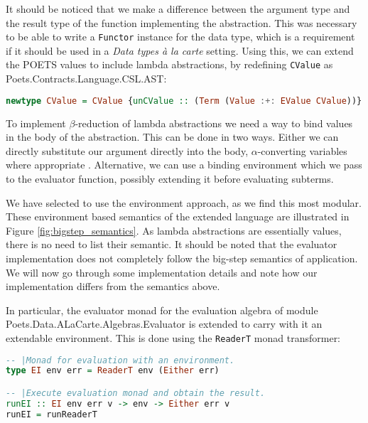 \documentclass[10pt,a4paper,final,oneside,openany,article]{memoir}
\begin{document}
It should be noticed that we make a difference between the argument
type and the result type of the function implementing the
abstraction. This was necessary to be able to write a
\lstinline{Functor} instance for the data type, which is a requirement
if it should be used in a \textit{Data types à la carte}
setting. Using this, we can extend the POETS values to include lambda
abstractions, by redefining \lstinline{CValue} as
Poets.Contracts.Language.CSL.AST:
\begin{lstlisting}[language=Haskell]
newtype CValue = CValue {unCValue :: (Term (Value :+: EValue CValue))}
\end{lstlisting}

To implement $\beta$-reduction of lambda abstractions we need a way to
bind values in the body of the abstraction. This can be done in two
ways. Either we can directly substitute our argument directly into the
body, $\alpha$-converting variables where appropriate
. Alternative, we can use a binding environment
which we pass to the evaluator function, possibly extending it before
evaluating subterms.

We have selected to use the environment approach, as we find this most
modular.  These environment based
semantics of the extended language are illustrated in Figure
\ref{fig:bigstep_semantics}. As lambda abstractions are essentially
values, there is no need to list their semantic. It should be noted
that the evaluator implementation does not completely follow the
big-step semantics of application. We will now go through some
implementation details and note how our implementation differs from
the semantics above.

In particular, the evaluator monad for the evaluation algebra of
module Poets.Data.ALaCarte.Algebras.Evaluator is extended to carry
with it an extendable environment. This is done using the
\lstinline{ReaderT} monad transformer:
\begin{lstlisting}[language=Haskell]
-- |Monad for evaluation with an environment.
type EI env err = ReaderT env (Either err)

-- |Execute evaluation monad and obtain the result.
runEI :: EI env err v -> env -> Either err v
runEI = runReaderT
\end{lstlisting}
\end{document}
